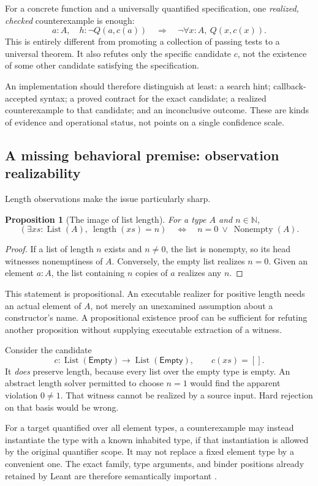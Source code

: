 \documentclass[11pt,a4paper]{article}
\newcommand{\N}{\mathbb N}
\theoremstyle{plain}
\newtheorem{proposition}[theorem]{Proposition}
\theoremstyle{definition}
\begin{document}
For a concrete function and a universally quantified specification, one \emph{realized, checked} counterexample is enough:
\[
 a:A,\quad h:\neg Q(a,c(a))
 \quad\Longrightarrow\quad
 \neg\forall x:A,\ Q(x,c(x)).
\]
This is entirely different from promoting a collection of passing tests to a universal theorem. It also refutes only the specific candidate $c$, not the existence of some other candidate satisfying the specification.

An implementation should therefore distinguish at least: a search hint; callback-accepted syntax; a proved contract for the exact candidate; a realized counterexample to that candidate; and an inconclusive outcome. These are kinds of evidence and operational status, not points on a single confidence scale.

\subsection{A missing behavioral premise: observation realizability}
Length observations make the issue particularly sharp.
\begin{proposition}[The image of list length]\label{prop:lengthimage}
For a type $A$ and $n\in\N$,
\[
 (\exists xs:\operatorname{List}(A),\ \operatorname{length}(xs)=n)
 \quad\Longleftrightarrow\quad
 n=0\ \lor\ \operatorname{Nonempty}(A).
\]
\end{proposition}
\begin{proof}
If a list of length $n$ exists and $n\ne0$, the list is nonempty, so its head witnesses nonemptiness of $A$. Conversely, the empty list realizes $n=0$. Given an element $a:A$, the list containing $n$ copies of $a$ realizes any $n$.
\end{proof}
This statement is propositional. An executable realizer for positive length needs an actual element of $A$, not merely an unexamined assumption about a constructor's name. A propositional existence proof can be sufficient for refuting another proposition without supplying executable extraction of a witness.

Consider the candidate
\[
 c:\operatorname{List}(\mathsf{Empty})\to\operatorname{List}(\mathsf{Empty}),
 \qquad c(xs)=[].
\]
It \emph{does} preserve length, because every list over the empty type is empty. An abstract length solver permitted to choose $n=1$ would find the apparent violation $0\ne1$. That witness cannot be realized by a source input. Hard rejection on that basis would be wrong.

For a target quantified over all element types, a counterexample may instead instantiate the type with a known inhabited type, if that instantiation is allowed by the original quantifier scope. It may not replace a fixed element type by a convenient one. The exact family, type arguments, and binder positions already retained by Leant are therefore semantically important \cite{leant-fragment,leant-contract}.
\end{document}
